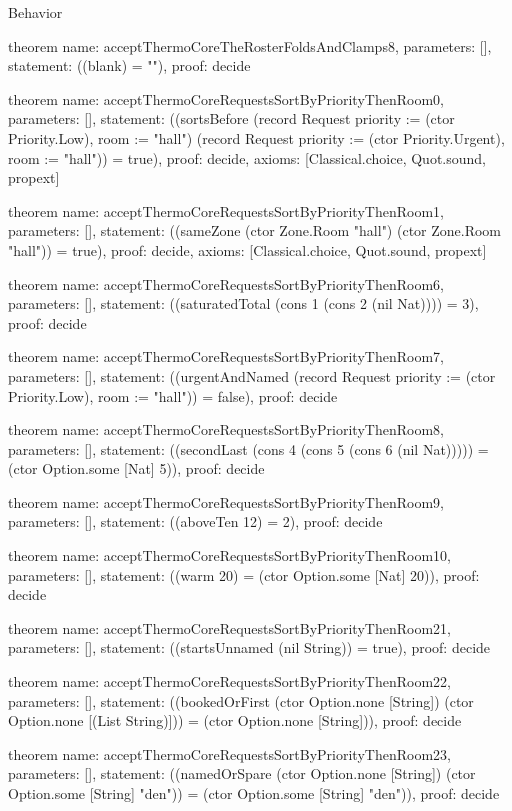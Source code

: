 \begin{lexlean}{Behavior}
\begin{semanticmodule}
theorem{
  name: acceptThermoCoreTheRosterFoldsAndClamps8,
  parameters: [],
  statement: ((blank) = ""),
  proof: decide{}
}

theorem{
  name: acceptThermoCoreRequestsSortByPriorityThenRoom0,
  parameters: [],
  statement: ((sortsBefore (record Request {priority := (ctor Priority.Low), room := "hall"}) (record Request {priority := (ctor Priority.Urgent), room := "hall"})) = true),
  proof: decide{},
  axioms: [Classical.choice, Quot.sound, propext]
}

theorem{
  name: acceptThermoCoreRequestsSortByPriorityThenRoom1,
  parameters: [],
  statement: ((sameZone (ctor Zone.Room "hall") (ctor Zone.Room "hall")) = true),
  proof: decide{},
  axioms: [Classical.choice, Quot.sound, propext]
}

theorem{
  name: acceptThermoCoreRequestsSortByPriorityThenRoom6,
  parameters: [],
  statement: ((saturatedTotal (cons 1 (cons 2 (nil Nat)))) = 3),
  proof: decide{}
}

theorem{
  name: acceptThermoCoreRequestsSortByPriorityThenRoom7,
  parameters: [],
  statement: ((urgentAndNamed (record Request {priority := (ctor Priority.Low), room := "hall"})) = false),
  proof: decide{}
}

theorem{
  name: acceptThermoCoreRequestsSortByPriorityThenRoom8,
  parameters: [],
  statement: ((secondLast (cons 4 (cons 5 (cons 6 (nil Nat))))) = (ctor Option.some [Nat] 5)),
  proof: decide{}
}

theorem{
  name: acceptThermoCoreRequestsSortByPriorityThenRoom9,
  parameters: [],
  statement: ((aboveTen 12) = 2),
  proof: decide{}
}

theorem{
  name: acceptThermoCoreRequestsSortByPriorityThenRoom10,
  parameters: [],
  statement: ((warm 20) = (ctor Option.some [Nat] 20)),
  proof: decide{}
}

theorem{
  name: acceptThermoCoreRequestsSortByPriorityThenRoom21,
  parameters: [],
  statement: ((startsUnnamed (nil String)) = true),
  proof: decide{}
}

theorem{
  name: acceptThermoCoreRequestsSortByPriorityThenRoom22,
  parameters: [],
  statement: ((bookedOrFirst (ctor Option.none [String]) (ctor Option.none [(List String)])) = (ctor Option.none [String])),
  proof: decide{}
}

theorem{
  name: acceptThermoCoreRequestsSortByPriorityThenRoom23,
  parameters: [],
  statement: ((namedOrSpare (ctor Option.none [String]) (ctor Option.some [String] "den")) = (ctor Option.some [String] "den")),
  proof: decide{}
}


\end{semanticmodule}
\end{lexlean}
